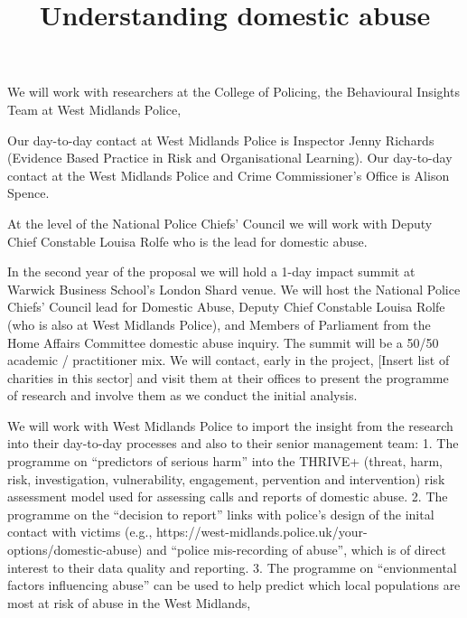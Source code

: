 \documentclass[11pt, a4paper]{article}
\begin{document}
\title{Understanding domestic abuse}
\date{}
\maketitle




We will work with researchers at the College of Policing, the Behavioural Insights Team at West Midlands Police, 

Our day-to-day contact at West Midlands Police is Inspector Jenny Richards (Evidence Based Practice in Risk and Organisational Learning). Our day-to-day contact at the West Midlands Police and Crime Commissioner's Office is Alison Spence. 

At the level of the National Police Chiefs' Council we will work with Deputy Chief Constable Louisa Rolfe who is the lead for domestic abuse. 



In the second year of the proposal we will hold a 1-day impact summit at Warwick Business School's London Shard venue. We will host the National Police Chiefs' Council lead for Domestic Abuse, Deputy Chief Constable Louisa Rolfe (who is also at West Midlands Police), and Members of Parliament from the Home Affairs Committee domestic abuse inquiry. The summit will be a 50/50 academic / practitioner mix. We will contact, early in the project, [Insert list of charities in this sector] and visit them at their offices to present the programme of research and involve them as we conduct the initial analysis.

We will work with West Midlands Police to import the insight from the research into their day-to-day processes and also to their senior management team: 1. The programme on ``predictors of serious harm'' into the THRIVE+ (threat, harm, risk, investigation, vulnerability, engagement, pervention and intervention) risk assessment model used for assessing calls and reports of domestic abuse. 2. The programme on the  ``decision to report'' links with police's design of the inital contact with victims (e.g., https://west-midlands.police.uk/your-options/domestic-abuse) and ``police mis-recording of abuse'', which is of direct interest to their data quality and reporting. 3. The programme on ``envionmental factors influencing abuse'' can be used to help predict which local populations are most at risk of abuse in the West Midlands, 
\end{document}
